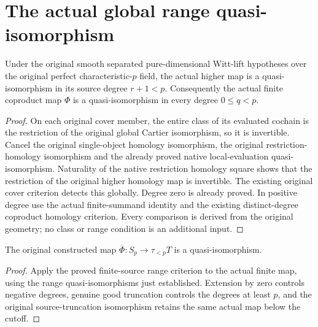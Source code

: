\section{The actual global range quasi-isomorphism}
\label{sec:di-actual-witt-global-quasi-isomorphism}

\begin{theorem}
\label{thm:di-actual-witt-positive-range}
\leanok
{}
Under the original smooth separated pure-dimensional Witt-lift
hypotheses over the original perfect characteristic-$p$ field, the actual
higher map is a quasi-isomorphism in its source degree $r+1<p$.
Consequently the actual finite coproduct map $\Phi$ is a
quasi-isomorphism in every degree $0\le q<p$.
\end{theorem}
\begin{proof}
\leanok
On each original cover member, the entire class of its evaluated
cochain is the restriction of the original global Cartier isomorphism,
so it is invertible. Cancel the original single-object homology
isomorphism, the original restriction-homology isomorphism and the
already proved native local-evaluation quasi-isomorphism. Naturality of
the native restriction homology square shows that the restriction of
the original higher homology map is invertible. The existing original
cover criterion detects this globally. Degree zero is already proved.
In positive degree use the actual finite-summand identity and the
existing distinct-degree coproduct homology criterion. Every comparison
is derived from the original geometry; no class or range condition is
an additional input.
\end{proof}

\begin{theorem}
\label{thm:di-actual-witt-truncated-map-quasi-isomorphism}
\leanok
{}
The original constructed map $\overline\Phi:S_p\to\tau_{<p}T$ is a
quasi-isomorphism.
\end{theorem}
\begin{proof}
\leanok
Apply the proved finite-source range criterion to the actual finite
map, using the range quasi-isomorphisms just established. Extension by
zero controls negative degrees, genuine good truncation controls the
degrees at least $p$, and the original source-truncation isomorphism
retains the same actual map below the cutoff.
\end{proof}

